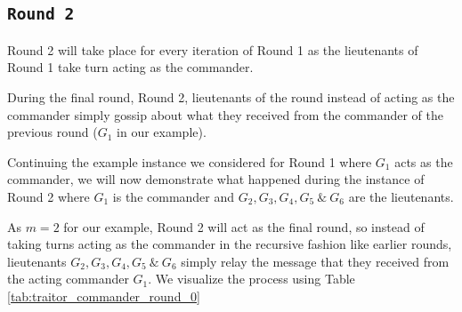 \documentclass[11pt]{article}
\newcommand{\gen}[1]{\ensuremath{G_{#1}}}
\begin{document}
\subsection*{\texttt{\large Round 2}}
Round 2 will take place for every iteration of Round 1 as the lieutenants of Round 1 take turn acting as the commander.

During the final round, Round 2, lieutenants of the round instead of acting as the commander simply gossip about what they received from the commander of the previous round ($\gen{1}$ in our example).

Continuing the example instance we considered for Round 1 where $\gen{1}$ acts as the commander, we will now demonstrate what happened during the instance of Round 2 where $\gen{1}$ is the commander and $\gen{2}, \gen{3}, \gen{4}, \gen{5} \  \& \ \gen{6}$ are the lieutenants.

As $m = 2$ for our example, Round 2 will act as the final round, so instead of taking turns acting as the commander in the recursive fashion like earlier rounds, lieutenants $\gen{2}, \gen{3}, \gen{4}, \gen{5} \  \& \ \gen{6}$ simply relay the message that they received from the acting commander $\gen{1}$. We visualize the process using Table \ref{tab:traitor_commander_round_0}

\vspace{1em}
\end{document}
